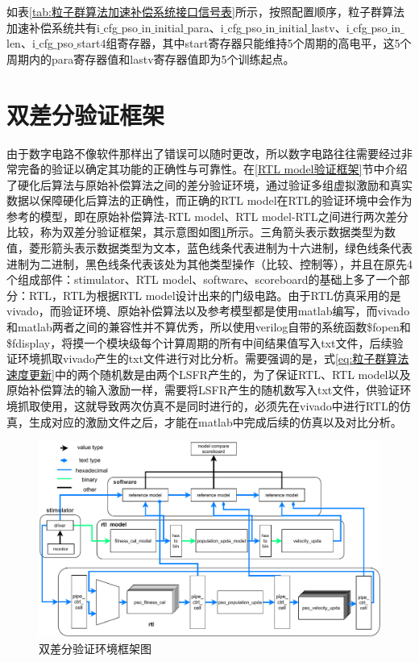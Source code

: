 如表\ref{tab:粒子群算法加速补偿系统接口信号表}所示，按照配置顺序，粒子群算法加速补偿系统共有i$\_$cfg$\_$pso$\_$in$\_$initial$\_$para、i$\_$cfg$\_$pso$\_$in$\_$initial$\_$lastv、i$\_$cfg$\_$pso$\_$in$\_$len、i$\_$cfg$\_$pso$\_$start4组寄存器，其中start寄存器只能维持5个周期的高电平，这5个周期内的para寄存器值和lastv寄存器值即为5个训练起点。

\section{双差分验证框架}
由于数字电路不像软件那样出了错误可以随时更改，所以数字电路往往需要经过非常完备的验证以确定其功能的正确性与可靠性。在\ref{RTL model验证框架}节中介绍了硬化后算法与原始补偿算法之间的差分验证环境，通过验证多组虚拟激励和真实数据以保障硬化后算法的正确性，而正确的RTL model在RTL的验证环境中会作为参考的模型，即在原始补偿算法-RTL model、RTL model-RTL之间进行两次差分比较，称为双差分验证框架，其示意图如图\ref{fig:双差分验证环境框架图}所示。三角箭头表示数据类型为数值，菱形箭头表示数据类型为文本，蓝色线条代表进制为十六进制，绿色线条代表进制为二进制，黑色线条代表该处为其他类型操作（比较、控制等），并且在原先4个组成部件：stimulator、RTL model、software、scoreboard的基础上多了一个部分：RTL，RTL为根据RTL model设计出来的门级电路。由于RTL仿真采用的是vivado，而验证环境、原始补偿算法以及参考模型都是使用matlab编写，而vivado和matlab两者之间的兼容性并不算优秀，所以使用verilog自带的系统函数\$fopen和\$fdisplay，将摸一个模块级每个计算周期的所有中间结果值写入txt文件，后续验证环境抓取vivado产生的txt文件进行对比分析。需要强调的是，式\eqref{eq:粒子群算法速度更新}中的两个随机数是由两个LSFR产生的，为了保证RTL、RTL model以及原始补偿算法的输入激励一样，需要将LSFR产生的随机数写入txt文件，供验证环境抓取使用，这就导致两次仿真不是同时进行的，必须先在vivado中进行RTL的仿真，生成对应的激励文件之后，才能在matlab中完成后续的仿真以及对比分析。
\begin{figure}[htb]
    \centering
    \includegraphics[width=14cm]{fig/5-fig/双差分验证环境.drawio.pdf}
    \caption{双差分验证环境框架图}
    \label{fig:双差分验证环境框架图}
\end{figure}

